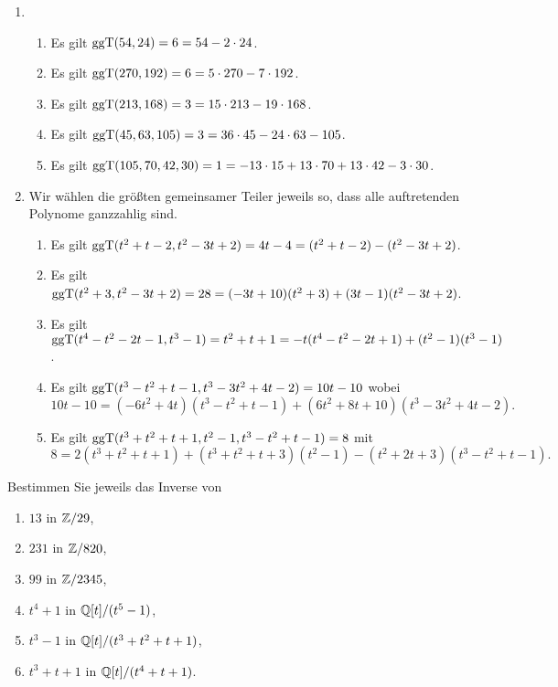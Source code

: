 \begin{solution}
  \begin{enumerate}
    \item
      \begin{enumerate}
        \item
          Es gilt $\operatorname{ggT}(54, 24) = 6 = 54 - 2 \cdot 24$.
        \item
          Es gilt $\operatorname{ggT}(270, 192) = 6 = 5 \cdot 270 - 7 \cdot 192$.
        \item
          Es gilt $\operatorname{ggT}(213, 168) = 3 = 15 \cdot 213 - 19 \cdot 168$.
        \item
          Es gilt $\operatorname{ggT}(45,63,105) = 3 = 36 \cdot 45 - 24 \cdot 63 - 105$.
        \item
          Es gilt $\operatorname{ggT}(105, 70, 42, 30) = 1 = -13 \cdot 15 + 13 \cdot 70 + 13 \cdot 42 - 3 \cdot 30$.
      \end{enumerate}
    \item
      Wir wählen die größten gemeinsamer Teiler jeweils so, dass alle auftretenden Polynome ganzzahlig sind.
      \begin{enumerate}
        \item
          Es gilt $\operatorname{ggT}(t^2 + t - 2, t^2 - 3t + 2) = 4t-4 = (t^2 + t - 2) - (t^2 - 3t + 2)$.
        \item
          Es gilt $\operatorname{ggT}(t^2 + 3, t^2 - 3t + 2) = 28 = (-3t + 10)(t^2 + 3) + (3t - 1)(t^2 - 3t + 2)$.
        \item
          Es gilt $\operatorname{ggT}(t^4 - t^2 - 2 t - 1, t^3 - 1) = t^2 + t + 1 = -t(t^4-t^2-2t+1) + (t^2-1)(t^3-1)$.
        \item
          Es gilt $\operatorname{ggT}(t^3 - t^2 + t - 1, t^3 - 3 t^2 + 4 t - 2) = 10t-10$ wobei
          \[
            10t-10 = (-6 t^2 + 4 t)(t^3 - t^2 + t - 1) + (6 t^2 + 8 t + 10)(t^3 - 3 t^2 + 4 t - 2).
          \]
        \item
          Es gilt $\operatorname{ggT}(t^3 + t^2 + t + 1, t^2 - 1, t^3 - t^2 + t - 1) = 8$ mit
          \[
              8 = 2(t^3 + t^2 + t + 1) + (t^3 + t^2 + t + 3)(t^2 - 1) - (t^2 + 2t + 3)(t^3 - t^2 + t - 1).
          \]
      \end{enumerate}
  \end{enumerate}
\end{solution}


\begin{question}[subtitle = Inverse in Quotienten]
  Bestimmen Sie jeweils das Inverse von
  \begin{enumerate}
    \item
      $13$ in $\mathbb{Z}/29$,
    \item
      $231$ in $\mathbb{Z}/820$,
    \item
      $99$ in  $\mathbb{Z}/2345$,
    \item
      $t^4 + 1$ in $\mathbb{Q}[t]/(t^5 - 1)$,
    \item
      $t^3 - 1$ in $\mathbb{Q}[t]/(t^3 + t^2 + t + 1)$,
    \item
      $t^3 + t + 1$ in $\mathbb{Q}[t]/(t^4 + t + 1)$.
  \end{enumerate}
\end{question}



